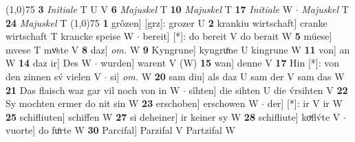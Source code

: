 \documentclass[8pt,a4paper,notitlepage]{article}
\begin{document}
\begin{table}[ht]
\begin{minipage}[t]{0.5\linewidth}
\line(1,0){75} \newline
\textbf{3} \textit{Initiale} T U V  \textbf{6} \textit{Majuskel} T  \textbf{10} \textit{Majuskel} T  \textbf{17} \textit{Initiale} W   $\cdot$ \textit{Majuskel} T  \textbf{24} \textit{Majuskel} T  \newline
\line(1,0){75} \newline
\textbf{1} grôzen] [grz]: grozer U \textbf{2} krankiu wirtschaft] cranke wirtschaft T krancke speise W  $\cdot$ bereit] [*]: do bereit V do berait W \textbf{5} müese] mvese T mvͦste V \textbf{8} daz] \textit{om.} W \textbf{9} Kyngrune] kyngruͦne U kingrune W \textbf{11} von] an W \textbf{14} daz ir] Des W  $\cdot$ wurden] warent V (W) \textbf{15} wan] denne V \textbf{17} Hin [*]: von den zinnen sv́ vielen V  $\cdot$ si] \textit{om.} W \textbf{20} sam diu] als daz U sam der V sam das W \textbf{21} Das flaisch waz gar vil noch von in W  $\cdot$ sîhten] die sihten U die v́rsihten V \textbf{22} Sy mochten ermer do nit sin W \textbf{23} erschoben] erschowen W  $\cdot$ der] [*]: ir V ir W \textbf{25} schifliuten] schiffen W \textbf{27} si deheiner] ir keiner sy W \textbf{28} schifliute] koͮflv́te V  $\cdot$ vuorte] do fuͦrte W \textbf{30} Parcifal] Parzifal V Partzifal W \newline
\end{minipage}
\end{table}
\end{document}
